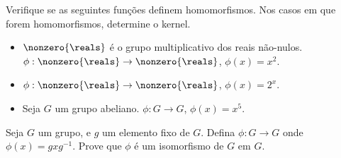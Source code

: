 \begin{exercise}
Verifique se as seguintes funções definem homomorfismos. Nos casos em que forem homomorfismos, determine o kernel.

\begin{itemize}
	\item $\nonzero{\reals}$ é o grupo multiplicativo dos reais não-nulos.
	$\phi : \nonzero{\reals} \to \nonzero{\reals}$, $\phi(x) = x^2$.

	\item $\phi : \nonzero{\reals}\to \nonzero{\reals}$, $\phi(x) = 2^x$. 

	\item Seja $G$ um grupo abeliano.
	$\phi : G \to G$, $\phi(x) = x^5$.
\end{itemize}
\end{exercise}

\begin{exercise}
Seja $G$ um grupo, e $g$ um elemento fixo de $G$. Defina $\phi : G \to G$ onde $\phi(x) = gxg^{-1}$. Prove que $\phi$ é um isomorfismo de $G$ em $G$.
\end{exercise}


